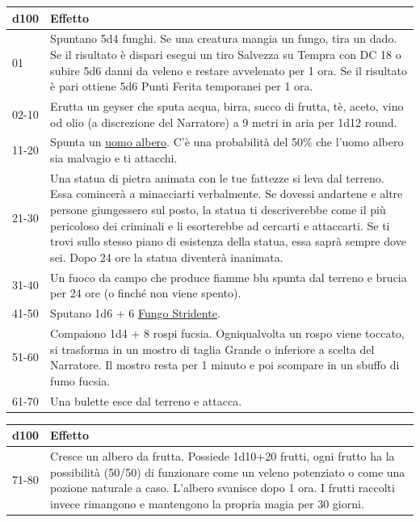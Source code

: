 \begin{multicols}{2}
\noindent\begin{tabularx}{\linewidth}{lX}
	\toprule
\rowcolor{gray!20}\textbf{d100} & \textbf{Effetto}\\
\toprule
01 &Spuntano 5d4 funghi. Se una creatura mangia un fungo, tira un dado. Se il risultato è dispari esegui un tiro Salvezza su Tempra con DC 18 o subire 5d6 danni da veleno e restare avvelenato per 1 ora. Se il risultato è pari ottiene 5d6 Punti Ferita temporanei per 1 ora.\\
\rowcolor{gray!20}02-10 &Erutta un geyser che sputa acqua, birra, succo di frutta, tè, aceto, vino od olio (a discrezione del Narratore) a 9 metri in aria per 1d12 round.\\
11-20 &Spunta un \hyperlink{Uomo Albero (Arborom)}{uomo albero}. C'è una probabilità del 50\% che l'uomo albero sia malvagio e ti attacchi.\\
\rowcolor{gray!20}21-30 &Una statua di pietra animata con le tue fattezze si leva dal terreno. Essa comincerà a minacciarti verbalmente. Se dovessi andartene e altre persone giungessero sul posto, la statua ti descriverebbe come il più pericoloso dei criminali e li esorterebbe ad cercarti e attaccarti. Se ti trovi sullo stesso piano di esistenza della statua, essa saprà sempre dove sei. Dopo 24 ore la statua diventerà inanimata.\\
31-40 &Un fuoco da campo che produce fiamme blu spunta dal terreno e brucia per 24 ore (o finché non viene spento).\\
\rowcolor{gray!20}41-50 &Sputano 1d6 + 6 \hyperlink{Fungo Stridente}{Fungo Stridente}.\\
51-60 &Compaiono 1d4 + 8 rospi fucsia. Ogniqualvolta un rospo viene toccato, si trasforma in un mostro di taglia Grande o inferiore a scelta del Narratore. Il mostro resta per 1 minuto e poi scompare in un sbuffo di fumo fucsia. \\
\rowcolor{gray!20}61-70 & Una bulette esce dal terreno e attacca.\\
\end{tabularx}
\noindent\begin{tabularx}{\linewidth}{lX}
\toprule
\rowcolor{gray!20}\textbf{d100} & \textbf{Effetto}\\
\toprule
71-80 &Cresce un albero da frutta. Possiede 1d10+20 frutti, ogni frutto ha la possibilità (50/50) di funzionare come un veleno potenziato o come una pozione naturale a caso. L'albero svanisce dopo 1 ora. I frutti raccolti invece rimangono e mantengono la propria magia per 30 giorni. \\

\end{tabularx}
\end{multicols}
